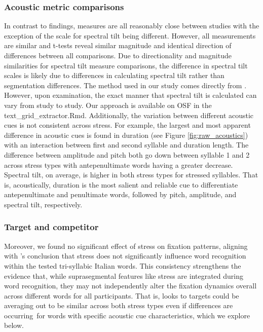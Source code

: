 \subsubsection{Acoustic metric comparisons}
In contrast to \cite{Corretta2023} findings, measures are all reasonably close between studies with the exception of the scale for spectral tilt being different. However, all measurements are similar and t-tests reveal similar magnitude and identical direction of differences between all comparisons. Due to directionality and magnitude similarities for spectral tilt measure comparisons, the difference in spectral tilt scales is likely due to differences in calculating spectral tilt rather than segmentation differences. The method used in our study comes directly from \citep{sluijter1996spectral,cutler2007dutch}. However, upon examination, the exact manner that spectral tilt is calculated can vary from study to study. Our approach is available on OSF in the text\_grid\_extractor.Rmd. Additionally, the variation between different acoustic cues is not consistent across stress. For example, the largest and most apparent difference in acoustic cues is found in duration (see Figure \ref{fig:raw_acoustics}) with an interaction between first and second syllable and duration length. The difference between amplitude and pitch both go down between syllable 1 and 2 across stress types with antepenultimate words having a greater decrease. Spectral tilt, on average, is higher in both stress types for stressed syllables. That is, acoustically, duration is the most salient and reliable cue to differentiate antepenultimate and penultimate words, followed by pitch, amplitude, and spectral tilt, respectively.


\subsubsection{Target and competitor}

Moreover, we found no significant effect of stress on fixation patterns, aligning with \cite{Sulpizio_McQueen_2012}'s conclusion that stress does not significantly influence word recognition within the tested tri-syllabic Italian words. This consistency strengthens the evidence that, while suprasegmental features like stress are integrated during word recognition, they may not independently alter the fixation dynamics overall across different words for all participants. That is, looks to targets could be averaging out to be similar across both stress types even if differences are occurring\ for words with specific acoustic cue characteristics, which we explore below. 

